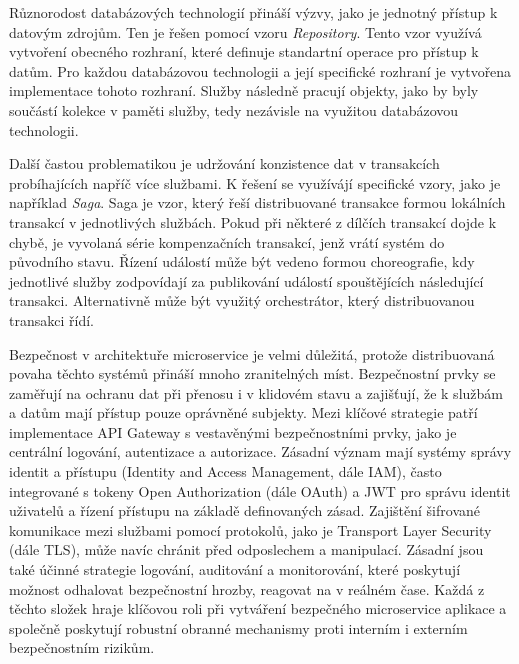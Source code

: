 Různorodost databázových technologií přináší výzvy, jako je jednotný přístup k datovým zdrojům. Ten je řešen pomocí vzoru \emph{Repository}. Tento vzor využívá vytvoření obecného rozhraní, které definuje standartní operace pro přístup k datům. Pro každou databázovou technologii a její specifické rozhraní je vytvořena implementace tohoto rozhraní. \cite{Newman2015} Služby následně pracují objekty, jako by byly součástí kolekce v paměti služby, tedy nezávisle na využitou databázovou technologii.


Další častou problematikou je udržování konzistence dat v transakcích probíhajících napříč více službami. K řešení se využívájí specifické vzory, jako je například \emph{Saga}. Saga je vzor, který řeší distribuované transakce formou lokálních transakcí v jednotlivých službách. Pokud při některé z dílčích transakcí dojde k chybě, je vyvolaná série kompenzačních transakcí, jenž vrátí systém do původního stavu. Řízení událostí může být vedeno formou choreografie, kdy jednotlivé služby zodpovídají za publikování událostí spouštějících následující transakci. Alternativně může být využitý orchestrátor, který distribuovanou transakci řídí. \cite{richardsonsaga}


Bezpečnost v architektuře microservice je velmi důležitá, protože distribuovaná povaha těchto systémů přináší mnoho zranitelných míst. Bezpečnostní prvky se zaměřují na ochranu dat při přenosu i v klidovém stavu a zajišťují, že k službám a datům mají přístup pouze oprávněné subjekty. Mezi klíčové strategie patří implementace API Gateway s vestavěnými bezpečnostními prvky, jako je centrální logování, autentizace a autorizace. \cite{Williams2023} Zásadní význam mají systémy správy identit a přístupu (Identity and Access Management, dále IAM), často integrované s tokeny Open Authorization (dále OAuth) a JWT pro správu identit uživatelů a řízení přístupu na základě definovaných zásad. Zajištění šifrované komunikace mezi službami pomocí protokolů, jako je Transport Layer Security (dále TLS), může navíc chránit před odposlechem a manipulací. \cite{Richardson2018} Zásadní jsou také účinné strategie logování, auditování a monitorování, které poskytují možnost odhalovat bezpečnostní hrozby, reagovat na v reálném čase. Každá z těchto složek hraje klíčovou roli při vytváření bezpečného microservice aplikace a společně poskytují robustní obranné mechanismy proti interním i externím bezpečnostním rizikům.

